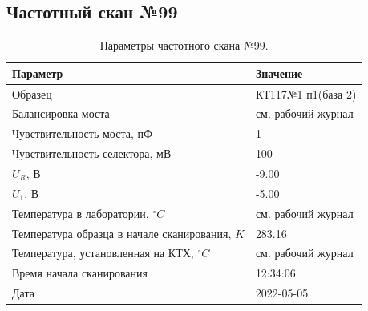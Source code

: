 \subsection{Частотный скан №99}
\begin{table}[!ht]
    \centering
    \caption{Параметры частотного скана №99.}
    \begin{tabular}{|l|l|}
        \hline
        Параметр                                       & Значение                  \\ \hline
        Образец                                        & КТ117№1 п1(база 2)        \\ \hline
        Балансировка моста                             & см. рабочий журнал        \\ \hline
        Чувствительность моста, пФ                     & 1                         \\ \hline
        Чувствительность селектора, мВ                 & 100                       \\ \hline
        $U_R$, В                                       & -9.00                     \\ \hline
        $U_1$, В                                       & -5.00                     \\ \hline
        Температура в лаборатории, $^\circ C$          & см. рабочий журнал        \\ \hline
        Температура образца в начале сканирования, $K$ & 283.16                    \\ \hline
        Температура, установленная на КТХ, $^\circ C$  & см. рабочий журнал        \\ \hline
        Время начала сканирования                      & 12:34:06                  \\ \hline
        Дата                                           & 2022-05-05                \\ \hline
    \end{tabular}
    \label{table:frequency_scan_99}
\end{table}

